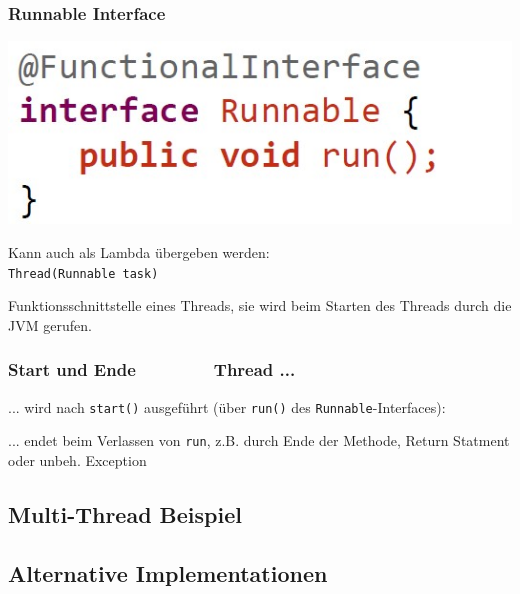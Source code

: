 {    \subsubsection{Runnable Interface}
        \begin{minipage}{0.48\columnwidth}
            \includegraphics[width=0.7\linewidth]{pictures/runnable-interface.jpg}
        \end{minipage}
        \hfill
        \begin{minipage}{0.48\columnwidth}
            Kann auch als Lambda übergeben werden:\\
            \verb|Thread(Runnable task)|
        \end{minipage}
        Funktionsschnittstelle eines Threads, sie wird beim Starten des Threads durch die JVM gerufen.
        \vspace{-0.3cm}

    \subsubsection{Start und Ende $\qquad\qquad$ Thread ...}
        ... wird nach \verb|start()| ausgeführt (über \verb|run()| des \verb|Runnable|-Interfaces):\\
        \vspace{-0.3cm}
        
        \vspace{-0.1cm}
        ... endet beim Verlassen von \verb|run|, z.B. durch Ende der Methode, Return Statment oder unbeh. Exception
        \vspace{-0.3cm}

\subsection{Multi-Thread Beispiel}
    \vspace{-0.3cm}
    
    \vspace{-0.2cm}

\subsection{Alternative Implementationen}
}
